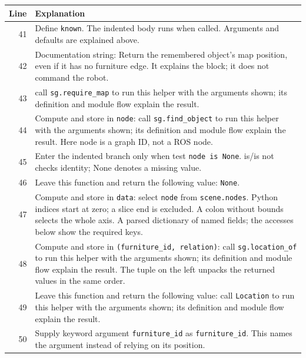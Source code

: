 \documentclass[11pt,a4paper]{book}
\begin{document}
\begin{longtable}{r p{}}

\textbf{Line} & \textbf{Explanation} \\ \hline \endhead

41 & Define \texttt{known}. The indented body runs when called. Arguments and defaults are explained above. \\

42 & Documentation string: Return the remembered object's map position, even if it has no furniture edge. It explains the block; it does not command the robot. \\

43 & call \texttt{sg.require\_map} to run this helper with the arguments shown; its definition and module flow explain the result. \\

44 & Compute and store in \texttt{node}: call \texttt{sg.find\_object} to run this helper with the arguments shown; its definition and module flow explain the result. Here node is a graph ID, not a ROS node. \\

45 & Enter the indented branch only when test \texttt{node is None}. is/is not checks identity; None denotes a missing value. \\

46 & Leave this function and return the following value: \texttt{None}. \\

47 & Compute and store in \texttt{data}: select \texttt{node} from \texttt{scene.nodes}. Python indices start at zero; a slice end is excluded. A colon without bounds selects the whole axis. A parsed dictionary of named fields; the accesses below show the required keys. \\

48 & Compute and store in \texttt{(furniture\_id, relation)}: call \texttt{sg.location\_of} to run this helper with the arguments shown; its definition and module flow explain the result. The tuple on the left unpacks the returned values in the same order. \\

49 & Leave this function and return the following value: call \texttt{Location} to run this helper with the arguments shown; its definition and module flow explain the result. \\

50 & Supply keyword argument \texttt{furniture\_id} as \texttt{furniture\_id}. This names the argument instead of relying on its position. \\


\end{longtable}
\end{document}
